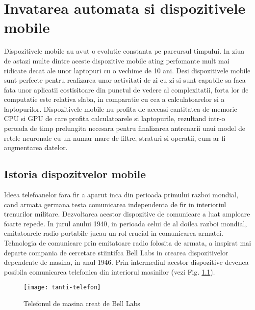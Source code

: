 
\chapter{Invatarea automata si dispozitivele mobile}
	Dispozitivele mobile au avut o evolutie constanta pe parcursul timpului. In ziua de astazi multe dintre aceste dispozitive mobile ating perfomante mult mai ridicate decat ale unor laptopuri cu o vechime de 10 ani. 
	Desi dispozitivele mobile sunt perfecte pentru realizarea unor activitati de zi cu zi si sunt capabile sa faca fata unor aplicatii costisitoare din punctul de vedere al complexitatii, forta lor de computatie este relativa slaba, in comparatie cu cea a calculatoarelor si a laptopurilor. Dispozitivele mobile nu profita de aceeasi cantitatea de memorie CPU si GPU de care profita calculatoarele si laptopurile, rezultand intr-o peroada de timp prelungita necesara pentru finalizarea antrenarii unui model de retele neuronale cu un numar mare de filtre, straturi si operatii, cum ar fi augmentarea datelor.
	
	\section{Istoria dispozitvelor mobile}
	Ideea telefoanelor fara fir a aparut inca din perioada primului razboi mondial, cand armata germana testa comunicarea independenta de fir in interioriul trenurilor militare. Dezvoltarea acestor dispozitive de comunicare a luat amploare foarte repede. In jurul anului 1940, in perioada celui de al doilea razboi mondial, emitatoarele radio portabile jucau un rol crucial in comunicarea armatei.
	Tehnologia de comunicare prin emitatoare radio folosita de armata, a inspirat mai departe compania de cercetare stiintifca Bell Labs in crearea dispozitivelor dependente de masina, in anul 1946. Prin intermediul acestor dispozitive devenea posibila comunicarea telefonica din interiorul masinilor (vezi Fig. \ref{fig:tanti-telefon}).
	
	\begin{figure}[H]
		\texttt{[image: tanti-telefon]}  
		\caption{\label{fig:tanti-telefon} Telefonul de masina creat de Bell Labs
			\protect
			\footnotemark}
	\end{figure}
	
	
